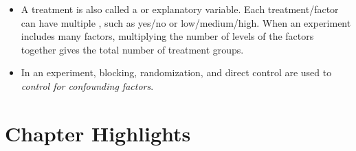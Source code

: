 \begin{itemize}
\item A treatment is also called a  or explanatory variable.  Each treatment/factor can have multiple , such as yes/no or low/medium/high.  When an experiment includes many factors, multiplying the number of levels of the factors together gives the total number of treatment groups.  

\item In an experiment, blocking, randomization, and direct control are used to \textit{control for confounding factors}.

\end{itemize}


\section{Chapter Highlights}

